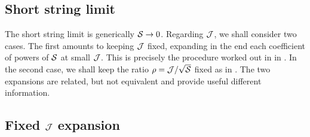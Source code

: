 \subsection{Short string limit}

The short string limit is generically $\mathcal S\to 0$. Regarding $\mathcal J$, we shall consider two cases. The first amounts to 
keeping $\mathcal J$ fixed, expanding in the end each coefficient of powers of $\mathcal S$ at small $\mathcal J$. This is 
precisely the procedure worked out in \cite{Gromov:2011bz} in \ads. In the second case, we shall keep the ratio
$\rho = \mc J/\sqrt\mc S$ fixed as in \cite{Beccaria:2012tu}. The two expansions are related, but not equivalent and provide useful different information.

\subsection{Fixed $\mathcal J$ expansion}

